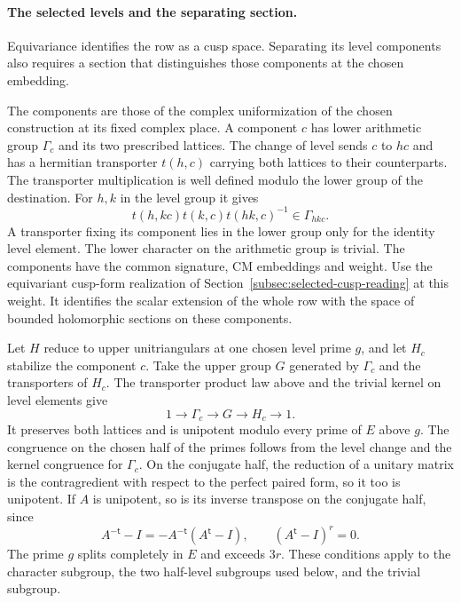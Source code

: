 \paragraph{The selected levels and the separating section.}

Equivariance identifies the row as a cusp space. Separating its level components also requires a section that distinguishes those components at the chosen embedding.

The components are those of the complex uniformization of the chosen construction at its fixed complex place. A component $c$ has lower
arithmetic group $\Gamma_c$ and its two prescribed lattices.
The change of level sends $c$ to $hc$ and has a hermitian
transporter $t(h,c)$ carrying both lattices to their counterparts.
The transporter multiplication is well defined modulo the lower group of the destination. For \(h,k\) in the level group it gives
\[
  t(h,kc)t(k,c)t(hk,c)^{-1}\in\Gamma_{hkc}.
\]
 A transporter fixing its
component lies in the lower group only for the identity level element.
The lower character on the arithmetic group is trivial. The
components have the common signature, CM embeddings and weight.
Use the equivariant cusp-form realization of
Section~\ref{subsec:selected-cusp-reading} at this weight. It identifies
the scalar extension of the whole row with the space of bounded
holomorphic sections on these components.
\label{cor:paired-cusp-ranks-1}

Let \(H\) reduce to upper unitriangulars at one chosen level prime \(g\), and let \(H_c\) stabilize the component \(c\). Take the upper group \(G\) generated by \(\Gamma_c\) and the transporters of \(H_c\). The transporter product law above and the trivial kernel on level elements give
\[
  1\longrightarrow\Gamma_c\longrightarrow G\longrightarrow H_c\longrightarrow1.
\]
 It preserves both lattices and is unipotent modulo every prime
of $E$ above $g$. The congruence on the chosen half of the primes
follows from the level change and the kernel congruence for $\Gamma_c$.
On the conjugate half, the reduction of a unitary matrix is the
contragredient with respect to the perfect paired form, so it too
is unipotent.
If \(A\) is unipotent, so is its inverse transpose on the conjugate half, since
\[
  A^{-\mathsf t}-I=-A^{-\mathsf t}(A^{\mathsf t}-I),\qquad (A^{\mathsf t}-I)^r=0 .
\]
 The prime $g$ splits completely in $E$ and exceeds $3r$.
These conditions apply to the character subgroup, the two half-level
subgroups used below, and the trivial subgroup.
\label{cor:paired-cusp-ranks-2}

